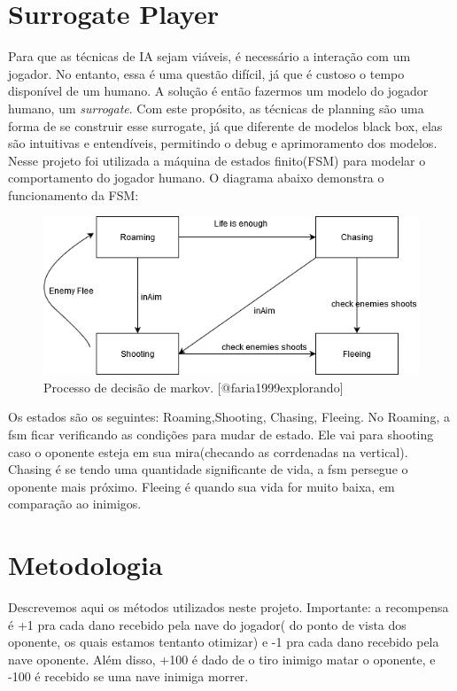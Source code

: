 \documentclass[]{book}
\begin{document}
\chapter{Surrogate Player}\label{surrogate-player}

Para que as técnicas de IA sejam viáveis, é necessário a interação com
um jogador. No entanto, essa é uma questão difícil, já que é custoso o
tempo disponível de um humano. A solução é então fazermos um modelo do
jogador humano, um \emph{surrogate}. Com este propósito, as técnicas de
planning são uma forma de se construir esse surrogate, já que diferente
de modelos black box, elas são intuitivas e entendíveis, permitindo o
debug e aprimoramento dos modelos. Nesse projeto foi utilizada a máquina
de estados finito(FSM) para modelar o comportamento do jogador humano. O
diagrama abaixo demonstra o funcionamento da FSM:

\begin{figure}

{\centering \includegraphics[width=0.5\linewidth]{content/imgs/FSM} 

}

\caption{Processo de decisão de markov. [@faria1999explorando]}\label{fig:fsm}
\end{figure}

Os estados são os seguintes: Roaming,Shooting, Chasing, Fleeing. No
Roaming, a fsm ficar verificando as condições para mudar de estado. Ele
vai para shooting caso o oponente esteja em sua mira(checando as
corrdenadas na vertical). Chasing é se tendo uma quantidade significante
de vida, a fsm persegue o oponente mais próximo. Fleeing é quando sua
vida for muito baixa, em comparação ao inimigos.

\chapter{Metodologia}\label{methods}

Descrevemos aqui os métodos utilizados neste projeto. Importante: a
recompensa é +1 pra cada dano recebido pela nave do jogador( do ponto de
vista dos oponente, os quais estamos tentanto otimizar) e -1 pra cada
dano recebido pela nave oponente. Além disso, +100 é dado de o tiro
inimigo matar o oponente, e -100 é recebido se uma nave inimiga morrer.
\end{document}
